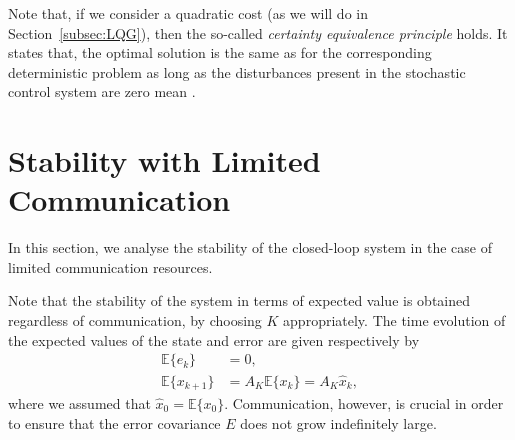 \documentclass[letterpaper, 10 pt, conference]{ieeeconf}  %
\newcommand{\E}{\mathbb{E}}
\begin{document}
Note that, if we consider a quadratic cost (as we will do in Section~\ref{subsec:LQG}), then 
the so-called \textit{certainty equivalence principle} holds. It states that, the optimal solution is the same as for the corresponding deterministic problem as long as the disturbances present in the stochastic control system are zero mean \cite{bertsekas1976}.


%
%
%
%
\section{Stability with Limited Communication}\label{sec:stability}

In this section, we analyse the stability of the closed-loop system in the case of limited communication resources. 

Note that the stability of the system in terms of expected value is obtained regardless of communication, by choosing $K$ appropriately.
The time evolution of the expected values of the state and error are given respectively by
\begin{align*}
\E\{e_k\} &= 0, \\
\E\{x_{k+1}\} &= A_K\E\{x_k\}= A_K \hat x_k,
\end{align*}
where we assumed that $\hat x_0 = \E\{x_0\}$. %
Communication, however, is crucial in order to ensure that the error covariance $E$ does not grow indefinitely large.


\end{document}
